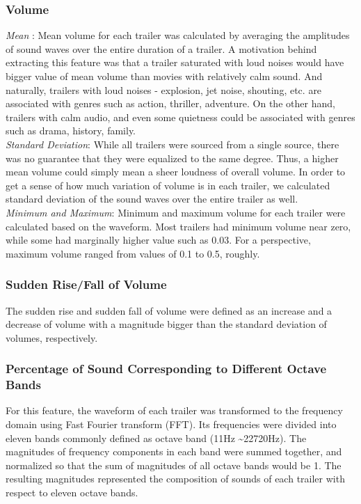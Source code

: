 \documentclass[letterpaper, 10 pt, conference]{ieeeconf}  %
\begin{document}
\subsubsection{Volume}
\textit{Mean} : Mean volume for each trailer was calculated by averaging the amplitudes of sound waves over the entire duration of a trailer. A motivation behind extracting this feature was that a trailer saturated with loud noises would have bigger value of mean volume than movies with relatively calm sound. And naturally, trailers with loud noises - explosion, jet noise, shouting, etc. are associated with genres such as action, thriller, adventure. On the other hand, trailers with calm audio, and even some quietness could be associated with genres such as drama, history, family. \\
\textit{Standard Deviation}: While all trailers were sourced from a single source, there was no guarantee that they were equalized to the same degree. Thus, a higher mean volume could simply mean a sheer loudness of overall volume. In order to get a sense of how much variation of volume is in each trailer, we calculated standard deviation of the sound waves over the entire trailer as well.\\
\textit{Minimum and Maximum}: Minimum and maximum volume for each trailer were calculated based on the waveform. Most trailers had minimum volume near zero, while some had marginally higher value such as 0.03. For a perspective, maximum volume ranged from values of 0.1 to 0.5, roughly.
\subsubsection{Sudden Rise/Fall of Volume}
The sudden rise and sudden fall of volume were defined as an increase and a decrease of volume with a magnitude bigger than the standard deviation of volumes, respectively. 
\subsubsection{Percentage of Sound Corresponding to Different Octave Bands}
For this feature, the waveform of each trailer was transformed to the frequency domain using Fast Fourier transform (FFT). Its frequencies were divided into eleven bands commonly defined as octave band (11Hz \sim 22720Hz). The magnitudes of frequency components in each band were summed together, and normalized so that the sum of magnitudes of all octave bands would be 1. The resulting magnitudes represented the composition of sounds of each trailer with respect to eleven octave bands. 
\end{document}
